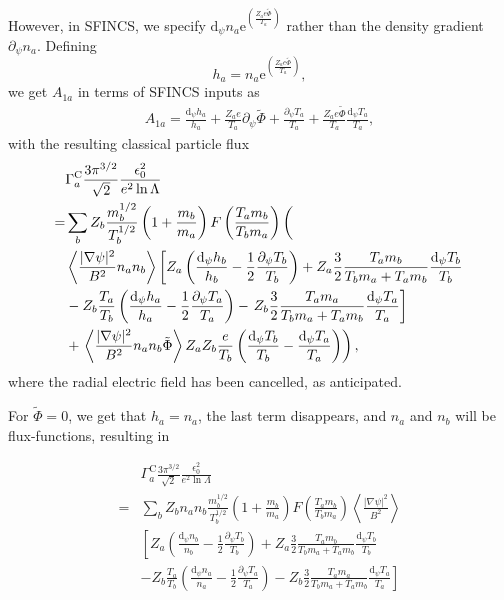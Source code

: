 \documentclass[12pt, a4paper]{article}
\newcommand{\e}{\ensuremath{\mathrm{e}}}
\newcommand{\p}{\ensuremath{\partial}}
\renewcommand{\d}{\ensuremath{\mathrm{d}}}
\newcommand{\lang}{\left\langle}
\newcommand{\rang}{\right\rangle}
\begin{document}
However, in SFINCS, we specify $\d_\psi n_a \e^{\left(\frac{Z_a e \tilde{\Phi}}{T_a} \right)}$ rather than the density gradient $\p_\psi n_a$. Defining
\begin{equation}
h_a =   n_a \e^{\left(\frac{Z_a e \tilde{\Phi}}{T_a} \right)},
\end{equation}
we get $A_{1a}$ in terms of SFINCS inputs as
\begin{align}
  A_{1a} = \frac{\d_\psi h_a}{h_a} + \frac{Z_a e}{T_a} \p_\psi \tilde{\Phi} + \frac{\p_\psi T_a}{T_a} + \frac{Z_a e \tilde{\Phi}}{T_a} \frac{\d_\psi T_a}{T_a},
\end{align}
with the resulting classical particle flux
\begin{equation}
  \begin{aligned}
    &\Gamma_a^{\text{C}} \frac{3\pi^{3/2}} {\sqrt{2}}\frac{\epsilon_0^2 }{ e^2 \ln \Lambda} \\
    =&  
    \sum_b Z_b \frac{m_b^{1/2}}{T_b^{1/2}} \left(1 + \frac{m_b}{m_a} \right) F\left(\frac{T_a m_b}{T_b m_a}\right) \left( \vphantom{ \lang \frac{|\nabla \psi|^2}{B^2} n_a n_b \rang}\right.\\
      &  \lang \frac{|\nabla \psi|^2}{B^2} n_a n_b \rang \left[Z_a     \left(\frac{\d_\psi h_b}{h_b}  - \frac{1}{2} \frac{\p_\psi T_b}{T_b}\right) 
      + Z_a  \frac{3}{2} \frac{T_a m_b}{T_b m_a + T_a m_b} \frac{\d_\psi T_b}{T_b} \right.\\
      & - Z_b  \frac{T_a}{T_b}\left(\frac{\d_\psi h_a}{h_a}  - \frac{1}{2} \frac{\p_\psi T_a}{T_a}\right) 
      - \left.Z_b \frac{3}{2} \frac{T_a m_a}{T_b m_a + T_a m_b}  \frac{\d_\psi T_a}{T_a} \right] \\
      & +\left. \lang \frac{|\nabla \psi|^2}{B^2} n_a n_b \tilde{\Phi}\rang Z_a Z_b \frac{e}{T_b} \left( \frac{\d_\psi T_b}{T_b} - \frac{\d_\psi T_a}{T_a} \right)\right),
\end{aligned} \label{eq:fluxgS}
\end{equation}
where the radial electric field has been cancelled, as anticipated.

For $\tilde{\Phi} = 0$, we get that $h_a = n_a$, the last term disappears, and $n_a$ and $n_b$ will be flux-functions, resulting in

\begin{equation}
  \begin{aligned}
    &\Gamma_a^{\text{C}} \frac{3\pi^{3/2}} {\sqrt{2}}\frac{\epsilon_0^2 }{ e^2 \ln \Lambda} \\
    =&  
    \sum_b Z_b  n_a n_b \frac{m_b^{1/2}}{T_b^{1/2}} \left(1 + \frac{m_b}{m_a} \right) F\left(\frac{T_a m_b}{T_b m_a}\right) \lang \frac{|\nabla \psi|^2}{B^2} \rang\\
      &   \left[Z_a     \left(\frac{\d_\psi n_b}{n_b}  - \frac{1}{2} \frac{\p_\psi T_b}{T_b}\right) \right.
      + Z_a  \frac{3}{2} \frac{T_a m_b}{T_b m_a + T_a m_b} \frac{\d_\psi T_b}{T_b} \\
      & - Z_b  \frac{T_a}{T_b}\left(\frac{\d_\psi n_a}{n_a}  - \frac{1}{2} \frac{\p_\psi T_a}{T_a}\right) 
      - \left.Z_b \frac{3}{2} \frac{T_a m_a}{T_b m_a + T_a m_b}  \frac{\d_\psi T_a}{T_a} \right] 
\end{aligned} \label{eq:fluxgSff}
\end{equation}
\end{document}
